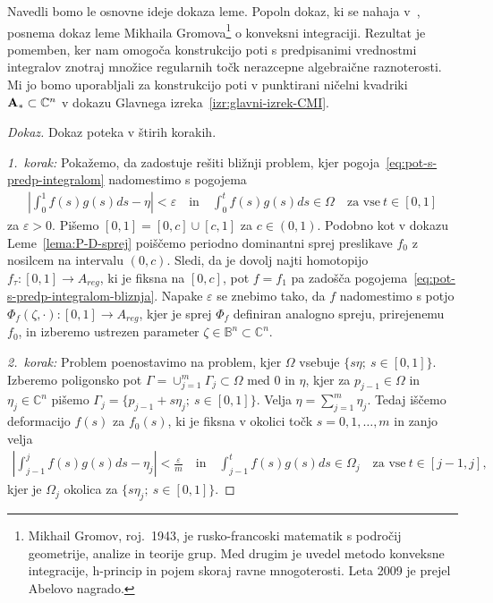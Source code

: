 \documentclass[12pt,a4paper,twoside]{article}
\theoremstyle{definition} %
\newenvironment{dokaz}[1][Dokaz]{\begin{proof}[#1]}{\end{proof}}
\theoremstyle{plain} %
\numberwithin{equation}{section}  %
\newcommand{\C}{\mathbb C}
\begin{document}
Navedli bomo le osnovne ideje dokaza leme. Popoln dokaz, ki se nahaja v~\cite[Lemma~3.5.4]{alarcon2021minimal}, posnema dokaz leme Mikhaila Gromova\footnote{Mikhail Gromov, roj.~1943, je rusko-francoski matematik s področij geometrije, analize in teorije grup. Med drugim je uvedel metodo konveksne integracije, h-princip in pojem skoraj ravne mnogoterosti. Leta 2009 je prejel Abelovo nagrado.}
o konveksni integraciji. Rezultat je pomemben, ker nam omogoča konstrukcijo poti s predpisanimi vrednostmi integralov znotraj množice regularnih točk nerazcepne algebraične raznoterosti. Mi jo bomo uporabljali za konstrukcijo poti v punktirani ničelni kvadriki $\textup{\textbf{A}}_{*} \subset \C^{n}$ v dokazu Glavnega izreka~\ref{izr:glavni-izrek-CMI}.

\begin{dokaz}
Dokaz poteka v štirih korakih.

\textit{1.~korak:} Pokažemo, da zadostuje rešiti bližnji problem, kjer pogoja~\eqref{eq:pot-s-predp-integralom} nadomestimo s pogojema
\begin{gather} \label{eq:pot-s-predp-integralom-bliznja}
\left| \int_{0}^{1} f(s)g(s)ds - \eta \right| < \varepsilon \quad \textrm{in} \quad \int_{0}^{t} f(s)g(s)ds \in \Omega \quad \textrm{za vse} \ t \in [0,1]
\end{gather}
za $\varepsilon > 0$.
Pišemo $[0,1] = [0,c] \cup [c,1]$ za $c \in (0,1)$.
Podobno kot v dokazu Leme~\ref{lema:P-D-sprej} poiščemo periodno dominantni sprej preslikave $f_0$ z nosilcem na intervalu $(0,c)$.
Sledi, da je dovolj najti homotopijo $f_{\tau} \colon [0,1] \to A_{reg}$, ki je fiksna na $[0,c]$, pot $f = f_{1}$ pa zadošča pogojema~\eqref{eq:pot-s-predp-integralom-bliznja}. Napake $\varepsilon$ se znebimo tako, da $f$ nadomestimo s potjo $\Phi_{f}(\zeta, \cdot) \colon [0,1] \to A_{reg}$, kjer je sprej $\Phi_{f}$ definiran analogno spreju, prirejenemu $f_0$, in izberemo ustrezen parameter $\zeta \in \mathbb{B}^{n} \subset \mathbb{C}^{n}$. \newline

\textit{2.~korak:} Problem poenostavimo na problem, kjer $\Omega$ vsebuje $\{ s\eta; \ s \in [0,1] \}$. \newline
Izberemo poligonsko pot $\Gamma = \cup_{j=1}^{m} \Gamma_{j} \subset \Omega$ med $0$ in $\eta$, kjer za $p_{j-1} \in \Omega$ in $\eta_{j} \in \mathbb{C}^{n}$ pišemo $\Gamma_{j} = \{ p_{j-1} + s\eta_{j}; \ s \in [0,1] \}$.
Velja $\eta = \sum_{j=1}^{m} \eta_{j}$.
Tedaj iščemo deformacijo $f(s)$ za $f_0(s)$, ki je fiksna v okolici točk $s = 0, 1, \dots , m$ in zanjo velja
\begin{gather*}
\left| \int_{j-1}^{j} f(s)g(s)ds - \eta_{j} \right| < \frac{\varepsilon}{m} \quad \textrm{in} \quad \int_{j-1}^{t} f(s)g(s)ds \in \Omega_{j} \quad \textrm{za vse} \ t \in [j-1,j],
\end{gather*}
kjer je $\Omega_{j}$ okolica za $\{ s \eta_{j}; \ s \in [0,1] \}$. \newline


\end{dokaz}
\end{document}
